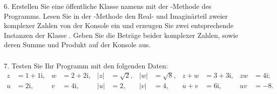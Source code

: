 \begin{frame}%
  \frametitle{\stitle}%
\begin{enumerate}
\item[6.]
  Erstellen Sie eine \"offentliche Klasse namens  mit der -Methode des Programms.
  Lesen Sie in der -Methode den Real- und Imagin\"arteil zweier komplexer Zahlen von der Konsole ein und erzeugen Sie zwei entsprechende Instanzen der Klasse .
  Geben Sie die Betr\"age beider komplexer Zahlen, sowie deren Summe und Produkt auf der Konsole aus.
\end{enumerate}

\end{frame}

\begin{frame}%
  \frametitle{\stitle}%


\end{frame}



\begin{frame}%
  \frametitle{\stitle}%
\begin{enumerate}
\item[7.]
  Testen Sie Ihr Programm mit den folgenden Daten:
\begin{align*}
  z &= 1 + 1\mathrm{i}, 
& w &= 2 + 2\mathrm{i}, 
& \lvert z \rvert &= \sqrt{2}, 
& \lvert w \rvert &= \sqrt{8},
& z + w &= 3 + 3\mathrm{i},
& zw    &= 4\mathrm{i}; \\
  u &= 2\mathrm{i}, 
& v &= 4\mathrm{i}, 
& \lvert u \rvert &= 2, 
& \lvert v \rvert &= 4,
& u + v &= 6\mathrm{i},
& uv    &= -8.
\end{align*}
\end{enumerate}
\end{frame}
